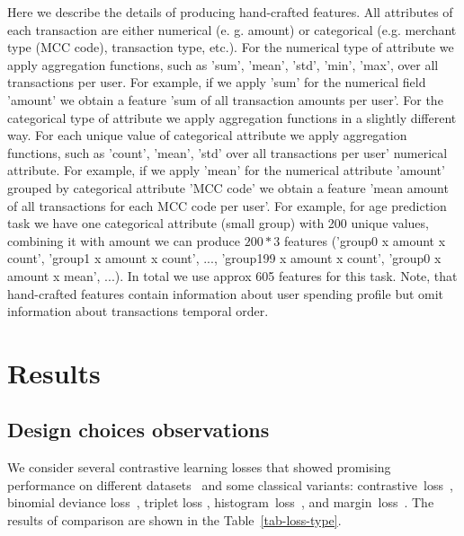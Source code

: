 \documentclass[sigconf]{acmart}
\begin{document}
Here we describe the details of producing hand-crafted features. All attributes of each transaction are either numerical (e. g. amount) or categorical (e.g. merchant type (MCC code), transaction type, etc.). 
For the numerical type of attribute we apply aggregation functions, such as 'sum', 'mean', 'std', 'min', 'max', over all transactions per user. For example, if we apply 'sum' for the numerical field 'amount' we obtain a feature 'sum of all transaction amounts per user'. 
For the categorical type of attribute we apply aggregation functions in a slightly different way. For each unique value of categorical attribute we apply aggregation functions, such as 'count', 'mean', 'std' over all transactions per user' numerical attribute. For example, if we apply 'mean' for the numerical attribute 'amount' grouped by categorical attribute 'MCC code' we obtain a feature 'mean amount of all transactions for each MCC code per user'. 
For example, for age prediction task we have one categorical attribute (small group) with 200 unique values, combining it with amount we can produce $200 * 3$ features ('group0 x amount x count',  'group1 x amount x count', ..., 'group199 x amount x count', 'group0 x amount x mean', ...). In total we use approx 605 features for this task. %
Note, that hand-crafted features contain information about user spending profile but omit information about transactions temporal order.

\section{Results} \label{app-sec-res}

\subsection{Design choices observations} \label{app-sec-design}

We consider several contrastive learning losses that showed promising performance on different datasets~\citep{Kaya2019DeepML} and some classical variants: contrastive~loss~\citep{Hadsell2006DimensionalityRB}, binomial deviance loss~\citep{Yi2014DeepML}, triplet loss \citep{Hoffer2015DeepML}, histogram~loss~\citep{Ustinova2016LearningDE}, and margin~loss~\citep{Manmatha2017SamplingMI}. The results of comparison are shown in the Table~\ref{tab-loss-type}.
\end{document}
